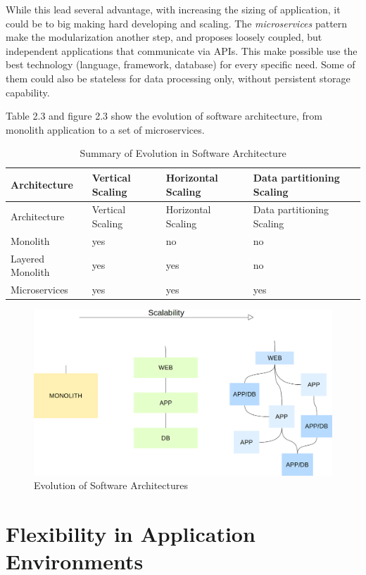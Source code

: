 While this lead several advantage, with increasing the sizing of
application, it could be to big making hard developing and scaling. The
\textit{microservices} pattern make the modularization another step, and
proposes loosely coupled, but independent applications that communicate
via APIs. This make possible use the best technology (language,
framework, database) for every specific need. Some of them could also be stateless for data processing only, without persistent storage capability.

Table 2.3 and figure 2.3 show the evolution of software architecture, from monolith application to a set of microservices.

\begin{longtable}[c]{@{}llll@{}}
\caption{Summary of Evolution in Software Architecture}\tabularnewline
\toprule
Architecture & Vertical Scaling & Horizontal Scaling & Data partitioning
Scaling\tabularnewline
\midrule
\endfirsthead
\toprule
Architecture & Vertical Scaling & Horizontal Scaling & Data partitioning
Scaling\tabularnewline
\midrule
\endhead
Monolith & yes & no & no\tabularnewline
Layered Monolith & yes & yes & no\tabularnewline
Microservices & yes & yes & yes\tabularnewline
\bottomrule
\end{longtable}

\begin{figure}[htbp]
\centering
\includegraphics{media/ch2-microservices.png}
\caption{Evolution of Software Architectures}
\end{figure}

\section{Flexibility in Application
Environments}\label{flexibility-in-application-environments}

